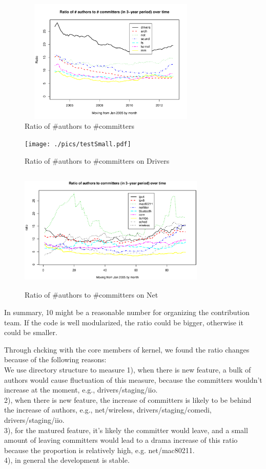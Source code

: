\documentclass{sig-alternate-05-2015}
\begin{document}
\begin{figure}
\centering
\includegraphics[height=2.33in, width=3.5in]{./pics/a2c.pdf}
\caption{Ratio of \#authors to \#committers}
\label{fig:atr2cmtr}
\end{figure}

\begin{figure}
\centering
\texttt{[image: ./pics/testSmall.pdf]}
\caption{Ratio of \#authors to \#committers on Drivers}
\label{fig:ratiodrivers}
\end{figure}

\begin{figure}
\centering
\includegraphics[height=2.33in, width=3.5in]{./pics/atr2cmtrNET.eps}
\caption{Ratio of \#authors to \#committers on Net}
\label{fig:rationet}
\end{figure}

In summary, 10 might be a reasonable number for organizing the contribution
team. If the code is well modularized, the ratio could be bigger, otherwise
it could be smaller.

Through chcking with the core members of kernel, we found the ratio changes because of the following reasons: \\
We use directory structure to measure
1), when there is new feature, a bulk of authors would cause fluctuation of this measure,
because the committers wouldn't increase at the moment, e.g., drivers/staging/iio. \\
2), when there is new feature, the increase of committers is likely to be behind
the increase of authors, e.g., net/wireless, drivers/staging/comedi, drivers/staging/iio.  \\
3), for the matured feature, it's likely the committer would leave, and a small amount
of leaving committers would lead to a drama increase of this ratio because the proportion
is relatively high, e.g. net/mac80211. \\
4), in general the development is stable.
\end{document}

